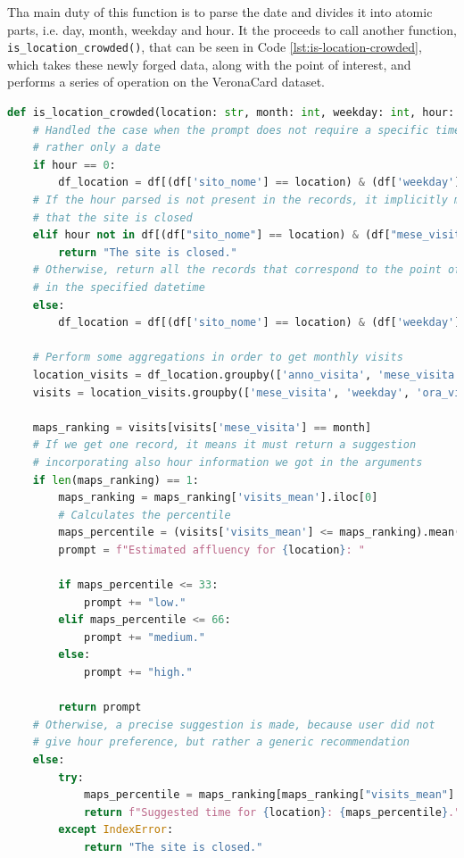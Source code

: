 Tha main duty of this function is to parse the date and divides it into atomic parts, i.e. day, month, weekday and hour. It the proceeds to call another function, \texttt{is\_location\_crowded()}, that can be seen in Code \ref{lst:is-location-crowded}, which takes these newly forged data, along with the point of interest, and performs a series of operation on the VeronaCard dataset.

\begin{center}
\begin{lstlisting}[language=Python, frame=single, caption=\texttt{is\_location\_crowded()} Function.]
def is_location_crowded(location: str, month: int, weekday: int, hour: int) -> str:
    # Handled the case when the prompt does not require a specific time,
    # rather only a date
    if hour == 0:
        df_location = df[(df['sito_nome'] == location) & (df['weekday'] == int(weekday))]
    # If the hour parsed is not present in the records, it implicitly means
    # that the site is closed
    elif hour not in df[(df["sito_nome"] == location) & (df["mese_visita"] == month)]["ora_visita_intervallo"].unique():
        return "The site is closed."
    # Otherwise, return all the records that correspond to the point of interest
    # in the specified datetime
    else:
        df_location = df[(df['sito_nome'] == location) & (df['weekday'] == int(weekday)) & (df['ora_visita_intervallo'] == int(hour))]

    # Perform some aggregations in order to get monthly visits
    location_visits = df_location.groupby(['anno_visita', 'mese_visita', 'weekday', 'ora_visita_intervallo']).size().reset_index(name='visits_number')
    visits = location_visits.groupby(['mese_visita', 'weekday', 'ora_visita_intervallo'])['visits_number'].mean().reset_index(name='visits_mean')

    maps_ranking = visits[visits['mese_visita'] == month]
    # If we get one record, it means it must return a suggestion
    # incorporating also hour information we got in the arguments
    if len(maps_ranking) == 1:
        maps_ranking = maps_ranking['visits_mean'].iloc[0]
        # Calculates the percentile
        maps_percentile = (visits['visits_mean'] <= maps_ranking).mean() * 100
        prompt = f"Estimated affluency for {location}: "

        if maps_percentile <= 33:
            prompt += "low."
        elif maps_percentile <= 66:
            prompt += "medium."
        else:
            prompt += "high."

        return prompt
    # Otherwise, a precise suggestion is made, because user did not
    # give hour preference, but rather a generic recommendation
    else:
        try:
            maps_percentile = maps_ranking[maps_ranking["visits_mean"] < maps_ranking["visits_mean"].median()].sort_values(by="ora_visita_intervallo")["ora_visita_intervallo"].iloc[0]
            return f"Suggested time for {location}: {maps_percentile}."
        except IndexError:
            return "The site is closed."
\end{lstlisting}
\label{lst:is-location-crowded}
\end{center}

